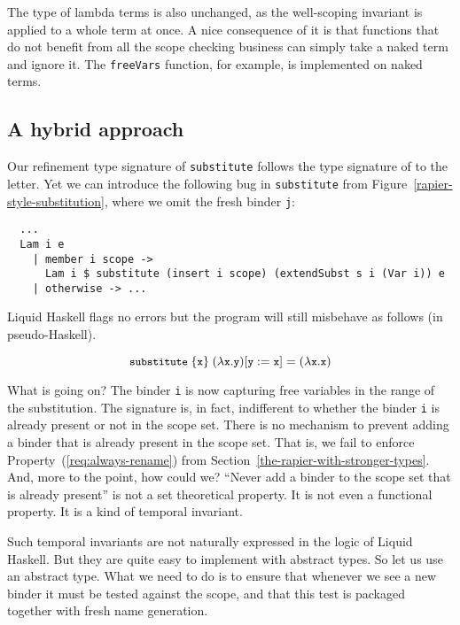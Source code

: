 \documentclass[sigconf]{acmart}
\newcommand{\tc}[1]{{\small\texttt{#1}}}
\newcommand{\codeblocksize}{\fontsize{6.5}{9}\selectfont}
\begin{document}
The type of lambda terms is also unchanged, as the well-scoping invariant is
applied to a whole term at once. A nice consequence of it is that functions
that do not benefit from all the scope checking business can simply take a naked
term and ignore it. The \tc{freeVars} function, for example, is implemented on
naked terms.

\subsection{A hybrid approach}
\label{ensuring-the-scope-set-is-checked}

Our refinement type signature of \tc{substitute} follows the type signature of
\citeauthor{maclaurin23} to the letter.
Yet we can introduce the following bug in \tc{substitute} from
Figure~\ref{rapier-style-substitution}, where we omit the fresh binder \tc{j}:
\begin{verbatim}
  ...
  Lam i e
    | member i scope ->
      Lam i $ substitute (insert i scope) (extendSubst s i (Var i)) e
    | otherwise -> ...
\end{verbatim}
Liquid Haskell flags no errors but the program will still misbehave as
follows (in pseudo-Haskell).

$$\codeblocksize{\tc{substitute}~\{\tc{x}\}~(\lambda{}\tc{x}. \tc{y}) [\tc{y}:=\tc{x}] = (\lambda{}\tc{x}. \tc{x})}$$

What is going on? The binder \tc{i} is now capturing free variables in the
range of the substitution. The signature is, in fact, indifferent to whether
the binder \tc{i} is already present or not in the scope set. There is no
mechanism to prevent adding a binder that is already present in the scope set.
That is, we fail to enforce Property~(\ref{req:always-rename}) from Section~\ref{the-rapier-with-stronger-types}.
And, more to the point, how could we? “Never add a binder to the scope set that is already
present” is not a set theoretical property. It is not even a functional property.
It is a kind of temporal invariant.

Such temporal invariants are not naturally expressed in the logic of Liquid Haskell.
But they are quite easy to implement with abstract types. So let us use an abstract
type. What we need to do is to ensure that whenever we see a new binder it must
be tested against the scope, and that this test is packaged together with fresh
name generation.
\end{document}
